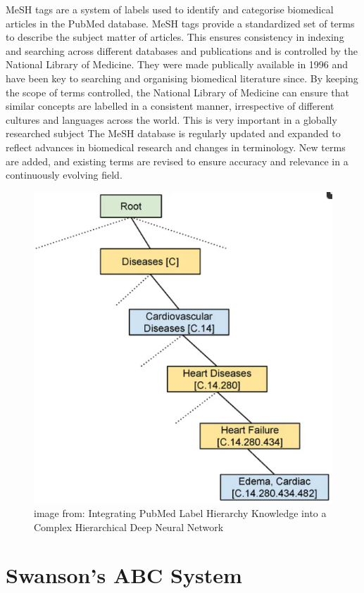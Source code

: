 \documentclass{l4proj}
\begin{document}
MeSH tags are a system of labels used to identify and categorise biomedical articles in the PubMed database. MeSH tags provide a standardized set of terms to describe the subject matter of articles. This ensures consistency in indexing and searching across different databases and publications and is controlled by the National Library of Medicine. They were made publically available in 1996 and have been key to searching and organising biomedical literature since. By keeping the scope of terms controlled, the National Library of Medicine can ensure that similar concepts are labelled in a consistent manner, irrespective of different cultures and languages across the world. This is very important in a globally researched subject The MeSH database is regularly updated and expanded to reflect advances in biomedical research and changes in terminology. New terms are added, and existing terms are revised to ensure accuracy and relevance in a continuously evolving field. 

\begin{figure}[h]
    \centering
    \includegraphics[width=0.6\linewidth]{images/mesh_label.png}
    \caption{image from: Integrating PubMed Label Hierarchy Knowledge into a Complex Hierarchical Deep Neural Network}
    \label{fig:mesh}
\end{figure}
 

\section{Swanson's ABC System}
\end{document}
